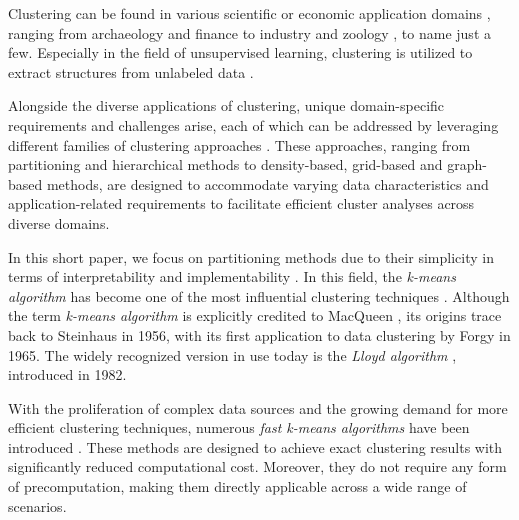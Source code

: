 Clustering can be found in various scientific or economic application domains \cite{ezugwu2022comprehensive,oyewole2023data, gan2020data}, ranging from archaeology \cite{troiano2024comparative} and finance \cite{cai2016clustering} to industry \cite{lee2021technological} and zoology \cite{shen2021multivariate}, to name just a few. Especially in the field of unsupervised learning, clustering is utilized to extract structures from unlabeled data \cite{chander2023data}.

Alongside the diverse applications of clustering, unique domain-specific requirements and challenges arise, each of which can be addressed by leveraging different families of clustering approaches \cite{xu2015comprehensive,han2012data}. These approaches, ranging from partitioning and hierarchical methods to density-based, grid-based and graph-based methods, are designed to accommodate varying data characteristics and application-related requirements to facilitate efficient cluster analyses across diverse domains.


In this short paper, we focus on partitioning methods due to their simplicity in terms of interpretability and implementability \cite{DBLP:conf/iiwas/BeecksBHLSD22}. In this field, the \emph{k-means algorithm} \cite{bock2007clustering,hans2008origins,DBLP:journals/prl/Jain10,steinley2006k} has become one of the most influential clustering techniques \cite{DBLP:journals/kais/WuKQGYMMNLYZSHS08,olukanmi2019rethinking}. Although the term \emph{k-means algorithm} is explicitly credited to MacQueen \cite{macqueen1967}, its origins trace back to Steinhaus \cite{steinhaus1956division} in 1956, with its first application to data clustering by Forgy \cite{forgy1965cluster} in 1965. The widely recognized version in use today is the \emph{Lloyd algorithm} \cite{DBLP:journals/tit/Lloyd82}, introduced in 1982.

With the proliferation of complex data sources and the growing demand for more efficient clustering techniques, numerous \emph{fast k-means algorithms} have been introduced \cite{DBLP:conf/icml/Elkan03,DBLP:conf/sdm/Hamerly10,drake2012accelerated,hamerly2015accelerating,DBLP:conf/icml/NewlingF16,DBLP:conf/icml/DingZSMM15}. These methods are designed to achieve exact clustering results with significantly reduced computational cost. Moreover, they do not require any form of precomputation, making them directly applicable across a wide range of scenarios.

